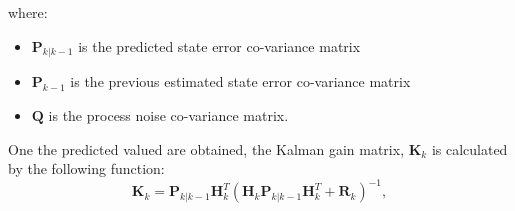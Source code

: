 where:
\begin{itemize}
    \item $\textbf{P}_{k|k-1}$ is the predicted state error co-variance matrix
    \item $\textbf{P}_{k-1}$ is the previous estimated state error co-variance matrix
    \item $\textbf{Q}$ is the process noise co-variance matrix.
\end{itemize}\par
One the predicted valued are obtained, the Kalman gain matrix, $\textbf{K}_k$ is calculated by the following function:
\begin{equation}
              \textbf{K}_k = \textbf{P}_{k|k-1} \textbf{H}^T_k(\textbf{H}_k\textbf{P}_{k|k-1} \textbf{H}^T_k + \textbf{R}_k)^{-1},  
\end{equation}


